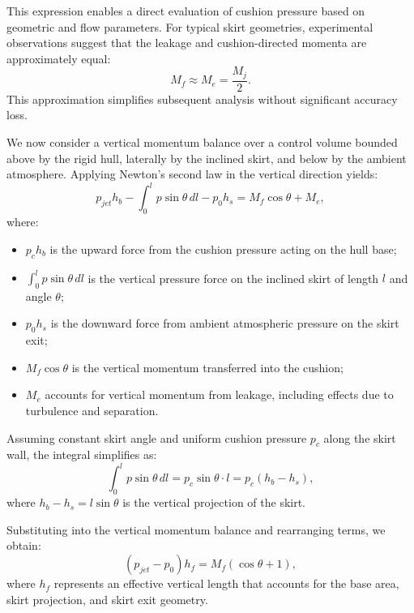 This expression enables a direct evaluation of cushion pressure based on geometric and flow parameters. For typical skirt geometries, experimental observations suggest that the leakage and cushion-directed momenta are approximately equal:
\begin{equation}
M_f \approx M_e = \frac{M_j}{2}.
\end{equation}
This approximation simplifies subsequent analysis without significant accuracy loss.

We now consider a vertical momentum balance over a control volume bounded above by the rigid hull, laterally by the inclined skirt, and below by the ambient atmosphere. Applying Newton’s second law in the vertical direction yields:
\begin{equation}
p_{jet} h_b - \int_0^l p \sin \theta \, dl - p_0 h_s = M_f \cos \theta + M_e,
\end{equation}
where:
\begin{itemize}
    \item \( p_c h_b \) is the upward force from the cushion pressure acting on the hull base;
    \item \( \int_0^l p \sin \theta \, dl \) is the vertical pressure force on the inclined skirt of length \( l \) and angle \( \theta \);
    \item \( p_0 h_s \) is the downward force from ambient atmospheric pressure on the skirt exit;
    \item \( M_f \cos \theta \) is the vertical momentum transferred into the cushion;
    \item \( M_e \) accounts for vertical momentum from leakage, including effects due to turbulence and separation.
\end{itemize}

Assuming constant skirt angle and uniform cushion pressure \( p_c \) along the skirt wall, the integral simplifies as:
\begin{equation}
\int_0^l p \sin \theta \, dl = p_c \sin \theta \cdot l = p_c (h_b - h_s),
\end{equation}
where \( h_b - h_s = l \sin \theta \) is the vertical projection of the skirt.

Substituting into the vertical momentum balance and rearranging terms, we obtain:
\begin{equation}
(p_{jet} - p_0) h_f = M_f ( \cos \theta + 1),
\end{equation}
where \( h_f \) represents an effective vertical length that accounts for the base area, skirt projection, and skirt exit geometry.

